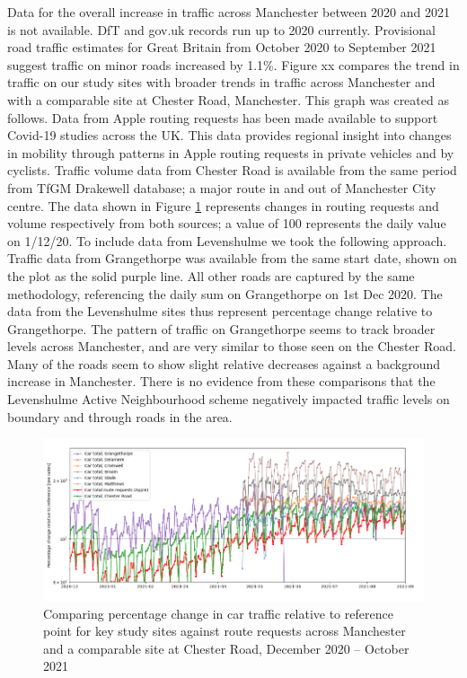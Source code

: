 \documentclass{article}
\begin{document}
Data for the overall increase in traffic across Manchester between 2020 and 2021 is not available. DfT and gov.uk records run up to 2020 currently. Provisional road traffic estimates for Great Britain from October 2020 to
September 2021 suggest traffic on minor roads increased by 1.1\%. Figure xx compares the trend in traffic on our study sites with broader trends in traffic across Manchester and with a comparable site at Chester Road, Manchester. This graph was created as follows. Data from Apple routing requests has been made available to support Covid-19 studies across the UK. This data provides regional insight into changes in mobility through patterns in Apple routing requests in private vehicles and by cyclists. Traffic volume data from Chester Road is available from the same period from TfGM Drakewell database; a major route in and out of Manchester City centre. The data shown in Figure \ref{fig::travel1} represents changes in routing requests and volume respectively from both sources; a value of 100 represents the daily value on 1/12/20. To include data from Levenshulme we took the following approach. Traffic data from Grangethorpe was available from the same start date, shown on the plot as the solid purple line. All other roads are captured by the same methodology, referencing the daily sum on Grangethorpe on 1st Dec 2020. The data from the Levenshulme sites thus represent percentage change relative to Grangethorpe. The pattern of traffic on Grangethorpe seems to track broader levels across Manchester, and are very similar to those seen on the Chester Road. Many of the roads seem to show slight relative decreases against a background increase in Manchester. There is no evidence from these comparisons that the Levenshulme Active Neighbourhood scheme negatively impacted traffic levels on boundary and through roads in the area. \\

\begin{figure}
	\centering
	\includegraphics[width=0.95\linewidth]{Figures/routing_requests.png}		
	\caption{Comparing percentage change in car traffic relative to reference point for key study sites against route requests across Manchester
and a comparable site at Chester Road, December 2020 – October 2021} \label{fig::travel1}
\end{figure}
\end{document}
